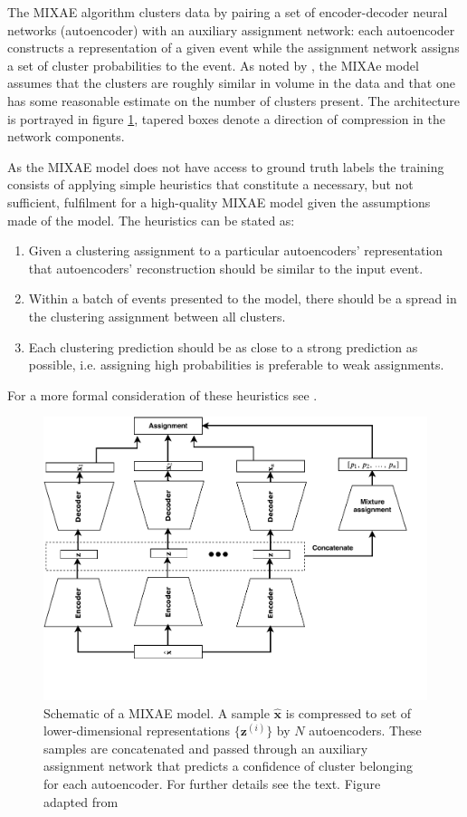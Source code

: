 \documentclass[preprint,12pt]{elsarticle}
\begin{document}
The MIXAE algorithm clusters data by pairing a set of encoder-decoder neural networks (autoencoder) with an auxiliary assignment network: each autoencoder constructs a representation of a given event while the assignment network assigns a set of cluster probabilities to the event. As noted by \citet{Zhang}, the MIXAe model assumes that the clusters are roughly similar in volume in the data and that one has some reasonable estimate on the number of clusters present. The architecture is portrayed in figure \ref{fig:mixae}, tapered boxes denote a direction of compression in the network components. 

As the MIXAE model does not have access to ground truth labels the training consists of applying simple heuristics that constitute a necessary, but not sufficient, fulfilment for a high-quality MIXAE model given the assumptions made of the model. The heuristics can be stated as: 
\begin{enumerate}
	\item  Given a clustering assignment to a particular autoencoders' representation that autoencoders' reconstruction should be similar to the input event. 
	\item Within a batch of events presented to the model, there should be a spread in the clustering assignment between all clusters. 
	\item Each clustering prediction should be as close to a strong prediction as possible, i.e. assigning high probabilities is preferable to weak assignments.
\end{enumerate}

\noindent For a more formal consideration of these heuristics see \citet{Zhang}.

\begin{figure}[tb]
	\centering
	\includegraphics[width=\textwidth]{plots/mixae.pdf}
	\caption[Mixture of autoencoders schematic]{Schematic of a MIXAE model. A sample $\hat{\boldsymbol{x}}$ is compressed to set of lower-dimensional representations $\{\boldsymbol{z}^{(i)}\}$ by $N$ autoencoders. These samples are concatenated and passed through an auxiliary assignment network that predicts a confidence of cluster belonging for each autoencoder. For further details see the text. Figure adapted from \citet{Zhang}}
	\label{fig:mixae}
\end{figure}
\end{document}

